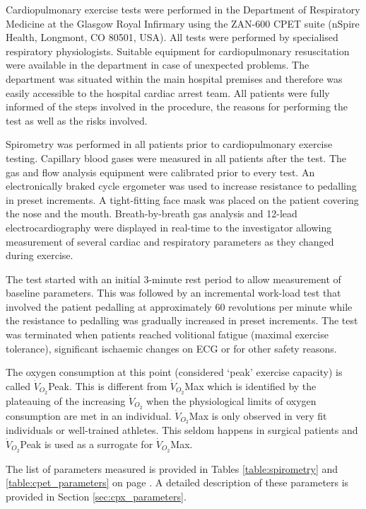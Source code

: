 Cardiopulmonary exercise tests were performed in the Department of Respiratory Medicine at the Glasgow Royal Infirmary using the ZAN-600 CPET suite (nSpire Health, Longmont, CO 80501, USA). 
All tests were performed by specialised respiratory physiologists. 
Suitable equipment for cardiopulmonary resuscitation were available in the department in case of unexpected problems. 
The department was situated within the main hospital premises and therefore was easily accessible to the hospital cardiac arrest team. 
All patients were fully informed of the steps involved in the procedure, the reasons for performing the test as well as the risks involved. 

Spirometry was performed in all patients prior to cardiopulmonary exercise testing. 
Capillary blood gases were measured in all patients after the test. 
The gas and flow analysis equipment were calibrated prior to every test.
An electronically braked cycle ergometer was used to increase resistance to pedalling in preset increments. 
A tight-fitting face mask was placed on the patient covering the nose and the mouth. 
Breath-by-breath gas analysis and 12-lead electrocardiography were displayed in real-time to the investigator allowing measurement of several cardiac and respiratory parameters as they changed during exercise.

The test started with an initial 3-minute rest period to allow measurement of baseline parameters. 
This was followed by an incremental work-load test that involved the patient pedalling at approximately 60 revolutions per minute while the resistance to pedalling was gradually increased in preset increments. 
The test was terminated when patients reached volitional fatigue (maximal exercise tolerance), significant ischaemic changes on ECG or for other safety reasons. 

The oxygen consumption at this point (considered `peak' exercise capacity) is called $\dot{V}_{O_2}$Peak.
This is different from $\dot{V}_{O_2}$Max which is identified by the plateauing of the increasing $\dot{V}_{O_2}$ when the physiological limits of oxygen consumption are met in an individual.
$\dot{V}_{O_2}$Max is only observed in very fit individuals or well-trained athletes.
This seldom happens in surgical patients and $\dot{V}_{O_2}$Peak is used as a surrogate for $\dot{V}_{O_2}$Max.

The list of parameters measured is provided in Tables \ref{table:spirometry} and \ref{table:cpet_parameters} on page \pageref{table:spirometry}.
A detailed description of these parameters is provided in Section \ref{sec:cpx_parameters}.


